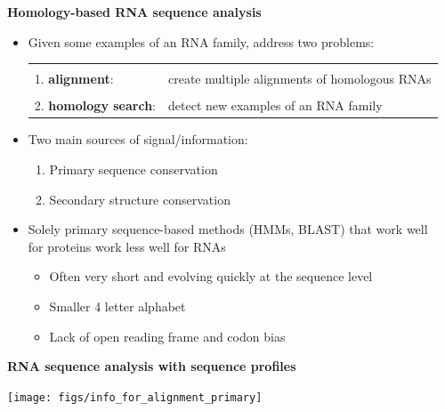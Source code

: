 \documentclass[landscape]{slides}
\begin{document}
\begin{slide}
\begin{center}
\textbf{Homology-based RNA sequence analysis}
\end{center}
\medskip

\small
\begin{itemize}
  \item Given some examples of an RNA family, address two problems:
  \begin{tabular}{ll}
    & \\
    1. \textbf{alignment}: & create multiple alignments of homologous RNAs \\
    & \\
    2. \textbf{homology search}: &  detect new examples of an RNA family
    \\
  \end{tabular}

\item
  Two main sources of signal/information:
  \begin{enumerate}
  \item
    Primary sequence conservation
  \item
    Secondary structure conservation
  \end{enumerate}
\item
  Solely primary sequence-based methods (HMMs, BLAST) that work well
  \\ for proteins work less well for RNAs
  \begin{itemize}
  \item
    Often very short and evolving quickly at the sequence level
  \item
    Smaller 4 letter alphabet 
  \item
    Lack of open reading frame and codon bias
  \end{itemize}
\end{itemize}
\vfill
\end{slide}
\begin{slide}
\begin{center}
\textbf{RNA sequence analysis with sequence profiles}
\end{center}
\medskip

\begin{center}
\texttt{[image: figs/info\_for\_alignment\_primary]}
\end{center}

\end{slide}
\end{document}
